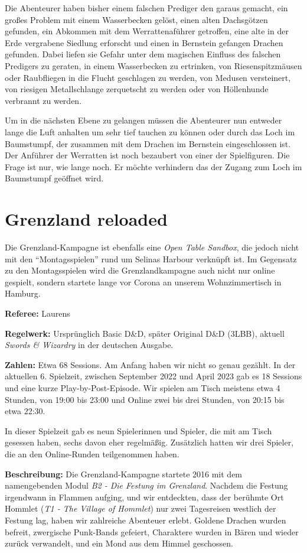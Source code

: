 \documentclass[11pt]{wbzine}
\begin{document}
\begin{multicols}{2}
Die Abenteurer haben bisher einem falschen Prediger den garaus gemacht,
ein großes Problem mit einem Wasserbecken gelöst, einen alten
Dachsgötzen gefunden, ein Abkommen mit dem Werrattenaführer getroffen,
eine alte in der Erde vergrabene Siedlung erforscht und einen in Bernstein
gefangen Drachen gefunden. Dabei liefen sie Gefahr unter dem magischen
Einfluss des falschen Predigers zu geraten, in einem Wasserbecken
zu ertrinken, von Riesenspitzmäusen oder Raubfliegen in die Flucht
geschlagen zu werden, von Medusen versteinert, von riesigen Metallschlange
zerquetscht zu werden oder von Höllenhunde verbrannt zu werden.

Um in die nächsten Ebene zu gelangen müssen die Abenteurer nun
entweder lange die Luft anhalten um sehr tief tauchen zu können oder
durch das Loch im Baumstumpf, der zusammen mit dem Drachen im Bernstein
eingeschlossen ist. Der Anführer der Werratten ist noch bezaubert von
einer der Spielfiguren. Die Frage ist nur, wie lange noch. Er möchte
verhindern das der Zugang zum Loch im Baumstumpf geöffnet wird.

\section{Grenzland reloaded}

Die Grenzland-Kampagne ist ebenfalls eine \textit{Open Table Sandbox},
die jedoch nicht mit den ``Montagsspielen'' rund um Selinas Harbour
verknüpft ist. Im Gegensatz zu den Montagsspielen wird die
Grenzlandkampagne auch nicht nur online gespielt, sondern startete
lange vor Corona an unserem Wohnzimmertisch in Hamburg.

\textbf{Referee:} Laurens

\textbf{Regelwerk:} Ursprünglich Basic D\&D, später Original D\&D
(3LBB),
aktuell \textit{Swords \& Wizardry} in der deutschen Ausgabe.

\textbf{Zahlen:} Etwa 68 Sessions. Am Anfang haben wir nicht so
genau gezählt. In der aktuellen 6. Spielzeit, zwischen September
2022 und April 2023 gab es 18 Sessions und eine kurze
Play-by-Post-Episode. Wir spielen am Tisch meistens etwa 4 Stunden,
von 19:00 bis 23:00 und Online zwei bis drei Stunden, von 20:15 bis
etwa 22:30. 

In dieser Spielzeit gab es neun Spielerinnen und Spieler, die mit am
Tisch gesessen haben, sechs davon eher regelmäßig. Zusätzlich
hatten wir drei Spieler, die an den Online-Runden teilgenommen
haben.

\textbf{Beschreibung:} Die Grenzland-Kampagne startete 2016 mit dem
namengebenden Modul \textit{B2 - Die Festung im Grenzland}. Nachdem
die Festung irgendwann in Flammen aufging, und wir entdeckten, dass
der berühmte Ort Hommlet (\textit{T1 - The Village of Hommlet}) nur
zwei Tagesreisen westlich der Festung lag, haben wir zahlreiche
Abenteuer erlebt. Goldene Drachen wurden befreit, zwergische
Punk-Bands gefeiert, Charaktere wurden in Bären und wieder zurück
verwandelt, und ein Mond aus dem Himmel geschossen.


\end{multicols}
\end{document}
